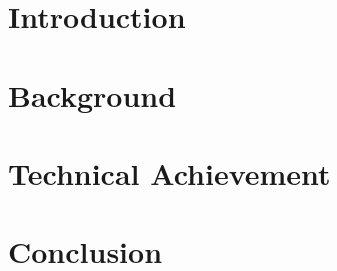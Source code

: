 \section{Introduction} \label{IntroductionSection}

\clearpage

\section{Background} \label{BackgroundSection}

\clearpage

\section{Technical Achievement} \label{TechnicalAchievementSection}

\newpage

\section{Conclusion} \label{Conclusion}

\clearpage